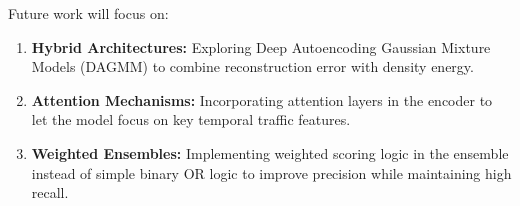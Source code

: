Future work will focus on:
\begin{enumerate}
  \item \textbf{Hybrid Architectures:} Exploring Deep Autoencoding Gaussian Mixture Models (DAGMM) to combine reconstruction error with density energy.
  \item \textbf{Attention Mechanisms:} Incorporating attention layers in the encoder to let the model focus on key temporal traffic features.
  \item \textbf{Weighted Ensembles:} Implementing weighted scoring logic in the ensemble instead of simple binary OR logic to improve precision while maintaining high recall.
\end{enumerate}
